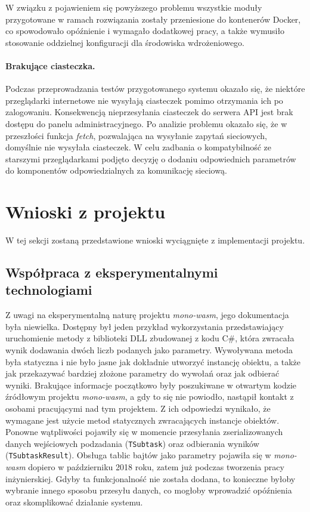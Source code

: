 \documentclass[a4paper,11pt,twoside]{report}
\theoremstyle{definition}
\begin{document}
            W związku z pojawieniem się powyższego problemu wszystkie moduły przygotowane w ramach rozwiązania zostały przeniesione do kontenerów Docker, co spowodowało opóźnienie i wymagało dodatkowej pracy, a także wymusiło stosowanie oddzielnej konfiguracji dla środowiska wdrożeniowego.
            
        \paragraph{Brakujące ciasteczka.}
            Podczas przeprowadzania testów przygotowanego systemu okazało się, że niektóre przeglądarki internetowe nie wysyłają ciasteczek pomimo otrzymania ich po zalogowaniu.
            Konsekwencją nieprzesyłania ciasteczek do serwera API jest brak dostępu do panelu administracyjnego. Po analizie problemu okazało się, że w przeszłości funkcja \textit{fetch}, pozwalająca na wysyłanie zapytań sieciowych, domyślnie nie wysyłała ciasteczek. W celu zadbania o kompatybilność ze starszymi przeglądarkami podjęto decyzję o dodaniu odpowiednich parametrów do komponentów odpowiedzialnych za komunikację sieciową.
    
    
    \section{Wnioski z projektu}
        \label{wnioski-z-projektu}
        W tej sekcji zostaną przedstawione wnioski wyciągnięte z implementacji projektu.
        
        \subsection{Współpraca z eksperymentalnymi technologiami}
            Z uwagi na eksperymentalną naturę projektu \textit{mono-wasm}, jego dokumentacja była niewielka. Dostępny był jeden przykład wykorzystania przedstawiający uruchomienie metody z biblioteki DLL zbudowanej z kodu C\#, która zwracała wynik dodawania dwóch liczb podanych jako parametry.
            Wywoływana metoda była statyczna i nie było jasne jak dokładnie utworzyć instancję obiektu, a także jak przekazywać bardziej złożone parametry do wywołań oraz jak odbierać wyniki.
            Brakujące informacje początkowo były poszukiwane w otwartym kodzie źródłowym projektu \textit{mono-wasm}, a gdy to się nie powiodło, nastąpił kontakt z osobami pracującymi nad tym projektem.
            Z ich odpowiedzi wynikało, że wymagane jest użycie metod statycznych zwracających instancje obiektów.
            Ponowne wątpliwości pojawiły się w momencie przesyłania zserializowanych danych wejściowych podzadania (\texttt{TSubtask}) oraz odbierania wyników (\texttt{TSubtaskResult}). Obsługa tablic bajtów jako parametry pojawiła się w \textit{mono-wasm} dopiero w październiku 2018 roku, zatem już podczas tworzenia pracy inżynierskiej.
            Gdyby ta funkcjonalność nie została dodana, to konieczne byłoby wybranie innego sposobu przesyłu danych, co mogłoby wprowadzić opóźnienia oraz skomplikować działanie systemu.
            
\end{document}
